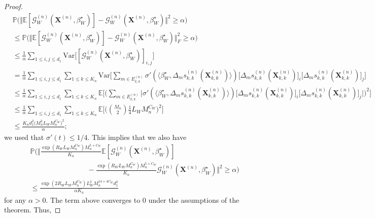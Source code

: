 \documentclass[10pt,a4paper]{amsart}
\begin{document}
\begin{proof}
{\allowdisplaybreaks
\begin{align*}
    &\mathbb{P}\big( \Vert  \mathbb{E}[\mathcal{G}_W^{(n)}(\mathbf{X}^{(n)},\beta_W^{\star})] - \mathcal{G}_W^{(n)}(\mathbf{X}^{(n)},\beta_W^{\star}) \Vert^2  \geq \alpha \big) \\
    & \leq \mathbb{P}\big( \Vert \mathbb{E}[\mathcal{G}_W^{(n)}(\mathbf{X}^{(n)},\beta_W^{\star})] - \mathcal{G}_W^{(n)}(\mathbf{X}^{(n)},\beta_W^{\star}) \Vert_F^2 \geq \alpha \big) \\
    & \leq \frac{1}{\alpha} \sum_{1 \leq i,j \leq d_1} \mathrm{Var}\big[ [\mathcal{G}_W^{(n)}(\mathbf{X}^{(n)},\beta_W^{\star})]_{i,j} \big] \\
    &= \frac{1}{\alpha } \sum_{1 \leq i,j \leq d_1} \sum_{1 \leq k \leq K_n} \mathrm{Var}\bigg[ \sum_{m \in E_{k,k}^{(n)}} \sigma'(\langle \beta_W^{\star},  \Delta_m s_{k,k}^{(n)}(\mathbf{X}_{k,k}^{(n)}) \rangle)  \big[\Delta_m s_{k,k}^{(n)}(\mathbf{X}_{k,k}^{(n)}) \big]_i \big[\Delta_m s_{k,k}^{(n)}(\mathbf{X}_{k,k}^{(n)})\big]_j  \bigg] \\
    &\leq \frac{1}{\alpha } \sum_{1 \leq i,j \leq d_1} \sum_{1 \leq k \leq K_n} \mathbb{E}\bigg[ \bigg(\sum_{m \in E_{k,k}^{(n)}} \big\vert \sigma'(\langle \beta_W^{\star},  \Delta_m s_{k,k}^{(n)}(\mathbf{X}_{k,k}^{(n)}) \rangle)  \big[\Delta_m s_{k,k}^{(n)}(\mathbf{X}_{k,k}^{(n)}) \big]_i \big[\Delta_m s_{k,k}^{(n)}(\mathbf{X}_{k,k}^{(n)})\big]_j \big\vert \bigg)^2 \bigg] \\
    & \leq \frac{1}{\alpha } \sum_{1 \leq i,j \leq d_1} \sum_{1 \leq k \leq K_n} \mathbb{E}\bigg[ \bigg( \binom{M_n}{2} \frac{1}{4} L_WM_n^{C_W} \bigg)^2 \bigg] \\
    & \leq \frac{K_n d_1^2  \big( M_n^2  L_W M_n^{C_W} \big)^2 }{\alpha };
\end{align*}}
 we used that $\sigma'(t) \leq 1/4$. 
This implies that we also have
\begin{align*}
     &\mathbb{P}\bigg( \bigg\Vert  \frac{\exp(R_WL_WM_n^{C_W}) M_n^{5+C_W}}{K_n}\mathbb{E}[\mathcal{G}_W^{(n)}(\mathbf{X}^{(n)},\beta_W^{\star})] \\
     & \qquad \qquad \qquad \qquad - \frac{\exp(R_WL_WM_n^{C_W}) M_n^{5+C_W}}{K_n}\mathcal{G}_W^{(n)}(\mathbf{X}^{(n)},\beta_W^{\star}) \bigg\Vert^2  \geq \alpha \bigg) \\
     & \leq  \frac{ \exp(2R_WL_WM_n^{C_W}) L_W^2 M_n^{14+4C_W} d_1^2  }{\alpha K_n }
\end{align*}
for any $\alpha>0$. The term above converges to $0$ under the assumptions  of the theorem. Thus, 

\end{proof}
\end{document}
